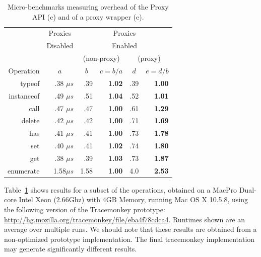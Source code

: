 \documentclass{sig-alternate}
\begin{document}
\begin{table}
  \begin{center}
  \begin{tabular}{r|r|r|r|r|r}
              & \multicolumn{1}{|c|}{Proxies} & \multicolumn{4}{|c}{Proxies}\\
              & \multicolumn{1}{|c|}{Disabled} & \multicolumn{4}{|c}{Enabled}\\
    \hline
           &   & \multicolumn{2}{|c|}{(non-proxy)} & \multicolumn{2}{|c}{(proxy)}\\
           \cline{3-6}
 Operation & \multicolumn{1}{|c|}{$a$} & \multicolumn{1}{|c|}{$b$} & \multicolumn{1}{|c|}{$c=b/a$} & \multicolumn{1}{|c|}{$d$} & \multicolumn{1}{|c}{$e=d/b$}\\
    \hline
    typeof     & ~.38 $\mu$\emph{s} & .39 & \textbf{1.02} & .39 & \textbf{1.00}\\
    instanceof & ~.49 $\mu$\emph{s} & .51 & \textbf{1.04} & .52 & \textbf{1.01}\\
    call       & ~.47 $\mu$\emph{s} & .47 & \textbf{1.00} & .61 & \textbf{1.29}\\
    delete     & ~.42 $\mu$\emph{s} & .42 & \textbf{1.00} & .71 & \textbf{1.69}\\
    has        & ~.41 $\mu$\emph{s} & .41 & \textbf{1.00} & .73 & \textbf{1.78}\\
    set        & ~.40 $\mu$\emph{s} & .41 & \textbf{1.02} & .74 & \textbf{1.80}\\
    get        & ~.38 $\mu$\emph{s} & .39 & \textbf{1.03} & .73 & \textbf{1.87}\\
    enumerate  & 1.58$\mu$\emph{s} & 1.58 & \textbf{1.00} & 4.0 & \textbf{2.53}\\
  \end{tabular}
  \end{center}
  \caption{Micro-benchmarks measuring overhead of the Proxy API (c) and of a proxy wrapper (e).}
  \label{tab:benchmarks}
\end{table}

Table~\ref{tab:benchmarks} shows results for a subset of the operations, obtained on a MacPro Dual-core Intel Xeon (2.66Ghz) with 4GB Memory, running Mac OS X 10.5.8, using the following version of the Tracemonkey prototype: \url{http://hg.mozilla.org/tracemonkey/file/eba4f78cdca4}. Runtimes shown are an average over multiple runs. We should note that these results are obtained from a non-optimized prototype implementation. The final tracemonkey implementation may generate significantly different results.
\end{document}
